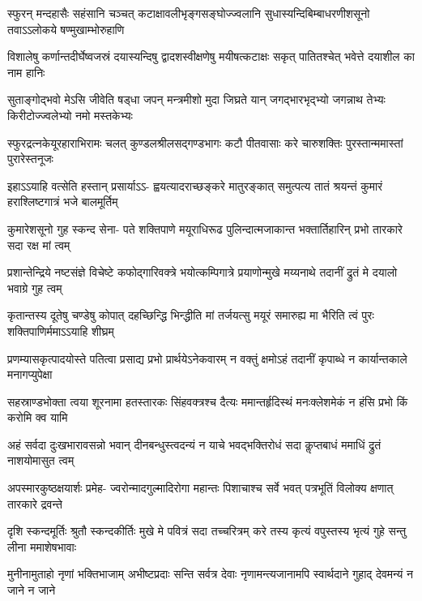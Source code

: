 \documentclass[a5paper,twoside,12pt]{book}
\begin{document}
\begin{center}
\fourlineindentedshloka
{स्फुरन् मन्दहासैः सहंसानि चञ्चत्}
{कटाक्षावलीभृङ्गसङ्घोज्ज्वलानि}
{सुधास्यन्दिबिम्बाधरणीशसूनो}
{तवाऽऽलोकये षण्मुखाम्भोरुहाणि}

\fourlineindentedshloka
{विशालेषु कर्णान्तदीर्घेष्वजस्रं}
{दयास्यन्दिषु द्वादशस्वीक्षणेषु}
{मयीषत्कटाक्षः सकृत् पातितश्चेत्}
{भवेत्ते दयाशील का नाम हानिः}

\fourlineindentedshloka
{सुताङ्गोद्भवो मेऽसि जीवेति षड्धा}
{जपन् मन्त्रमीशो मुदा जिघ्रते यान्}
{जगद्भारभृद्भ्यो जगन्नाथ तेभ्यः}
{किरीटोज्ज्वलेभ्यो नमो मस्तकेभ्यः}

\fourlineindentedshloka
{स्फुरद्रत्नकेयूरहाराभिरामः}
{चलत् कुण्डलश्रीलसद्गण्डभागः}
{कटौ पीतवासाः करे चारुशक्तिः}
{पुरस्तान्ममास्तां पुरारेस्तनूजः}

\fourlineindentedshloka
{इहाऽऽयाहि वत्सेति हस्तान् प्रसार्याऽऽ-}
{ह्वयत्यादराच्छङ्करे मातुरङ्कात्}
{समुत्पत्य तातं श्रयन्तं कुमारं}
{हराश्लिष्टगात्रं भजे बालमूर्तिम्}

\fourlineindentedshloka
{कुमारेशसूनो गुह स्कन्द सेना-}
{पते शक्तिपाणे मयूराधिरूढ}
{पुलिन्दात्मजाकान्त भक्तार्तिहारिन्}
{प्रभो तारकारे सदा रक्ष मां त्वम्}

\fourlineindentedshloka
{प्रशान्तेन्द्रिये नष्टसंज्ञे विचेष्टे}
{कफोद्गारिवक्त्रे भयोत्कम्पिगात्रे}
{प्रयाणोन्मुखे मय्यनाथे तदानीं}
{द्रुतं मे दयालो भवाग्रे गुह त्वम्}

\fourlineindentedshloka
{कृतान्तस्य दूतेषु चण्डेषु कोपात्}
{दहच्छिन्द्धि भिन्द्धीति मां तर्जयत्सु}
{मयूरं समारुह्य मा भैरिति त्वं}
{पुरः शक्तिपाणिर्ममाऽऽयाहि शीघ्रम्}

\fourlineindentedshloka
{प्रणम्यासकृत्पादयोस्ते पतित्वा}
{प्रसाद्य प्रभो प्रार्थयेऽनेकवारम्}
{न वक्तुं क्षमोऽहं तदानीं कृपाब्धे}
{न कार्यान्तकाले मनागप्युपेक्षा}

\fourlineindentedshloka
{सहस्राण्डभोक्ता त्वया शूरनामा}
{हतस्तारकः सिंहवक्त्रश्च दैत्यः}
{ममान्तर्हृदिस्थं मनःक्लेशमेकं}
{न हंसि प्रभो किं करोमि क्व यामि}

\fourlineindentedshloka
{अहं सर्वदा दुःखभारावसन्नो}
{भवान् दीनबन्धुस्त्वदन्यं न याचे}
{भवद्भक्तिरोधं सदा कॢप्तबाधं}
{ममाधिं द्रुतं नाशयोमासुत त्वम्}

\fourlineindentedshloka
{अपस्मारकुष्ठक्षयार्शः प्रमेह-}
{ज्वरोन्मादगुल्मादिरोगा महान्तः}
{पिशाचाश्च सर्वे भवत् पत्रभूतिं}
{विलोक्य क्षणात् तारकारे द्रवन्ते}

\fourlineindentedshloka
{दृशि स्कन्दमूर्तिः श्रुतौ स्कन्दकीर्तिः}
{मुखे मे पवित्रं सदा तच्चरित्रम्}
{करे तस्य कृत्यं वपुस्तस्य भृत्यं}
{गुहे सन्तु लीना ममाशेषभावाः}

\fourlineindentedshloka
{मुनीनामुताहो नृणां भक्तिभाजाम्}
{अभीष्टप्रदाः सन्ति सर्वत्र देवाः}
{नृणामन्त्यजानामपि स्वार्थदाने}
{गुहाद् देवमन्यं न जाने न जाने}


\end{center}
\end{document}
